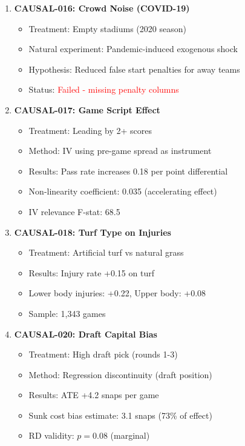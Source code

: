 \begin{enumerate}[resume]
    \item \textbf{CAUSAL-016: Crowd Noise (COVID-19)}
    \begin{itemize}
        \item Treatment: Empty stadiums (2020 season)
        \item Natural experiment: Pandemic-induced exogenous shock
        \item Hypothesis: Reduced false start penalties for away teams
        \item Status: \textcolor{red}{Failed - missing penalty columns}
    \end{itemize}

    \item \textbf{CAUSAL-017: Game Script Effect} \checkmark
    \begin{itemize}
        \item Treatment: Leading by 2+ scores
        \item Method: IV using pre-game spread as instrument
        \item Results: Pass rate increases 0.18 per point differential
        \item Non-linearity coefficient: 0.035 (accelerating effect)
        \item IV relevance F-stat: 68.5
    \end{itemize}

    \item \textbf{CAUSAL-018: Turf Type on Injuries} \checkmark
    \begin{itemize}
        \item Treatment: Artificial turf vs natural grass
        \item Results: Injury rate +0.15 on turf
        \item Lower body injuries: +0.22, Upper body: +0.08
        \item Sample: 1,343 games
    \end{itemize}

    \item \textbf{CAUSAL-020: Draft Capital Bias} \checkmark
    \begin{itemize}
        \item Treatment: High draft pick (rounds 1-3)
        \item Method: Regression discontinuity (draft position)
        \item Results: ATE +4.2 snaps per game
        \item Sunk cost bias estimate: 3.1 snaps (73\% of effect)
        \item RD validity: $p = 0.08$ (marginal)
    \end{itemize}
\end{enumerate}

